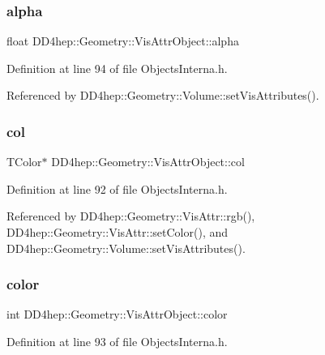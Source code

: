 \subsubsection{\texorpdfstring{alpha}{alpha}}
{\footnotesize\ttfamily float D\+D4hep\+::\+Geometry\+::\+Vis\+Attr\+Object\+::alpha}



Definition at line 94 of file Objects\+Interna.\+h.



Referenced by D\+D4hep\+::\+Geometry\+::\+Volume\+::set\+Vis\+Attributes().

\hypertarget{class_d_d4hep_1_1_geometry_1_1_vis_attr_object_a5ac12c903f90e8cf16eb04ba55568f38}{}\label{class_d_d4hep_1_1_geometry_1_1_vis_attr_object_a5ac12c903f90e8cf16eb04ba55568f38} 
\subsubsection{\texorpdfstring{col}{col}}
{\footnotesize\ttfamily T\+Color$\ast$ D\+D4hep\+::\+Geometry\+::\+Vis\+Attr\+Object\+::col}



Definition at line 92 of file Objects\+Interna.\+h.



Referenced by D\+D4hep\+::\+Geometry\+::\+Vis\+Attr\+::rgb(), D\+D4hep\+::\+Geometry\+::\+Vis\+Attr\+::set\+Color(), and D\+D4hep\+::\+Geometry\+::\+Volume\+::set\+Vis\+Attributes().

\hypertarget{class_d_d4hep_1_1_geometry_1_1_vis_attr_object_a1bff0c73a37bb6791006a4f0761d9f3a}{}\label{class_d_d4hep_1_1_geometry_1_1_vis_attr_object_a1bff0c73a37bb6791006a4f0761d9f3a} 
\subsubsection{\texorpdfstring{color}{color}}
{\footnotesize\ttfamily int D\+D4hep\+::\+Geometry\+::\+Vis\+Attr\+Object\+::color}



Definition at line 93 of file Objects\+Interna.\+h.



